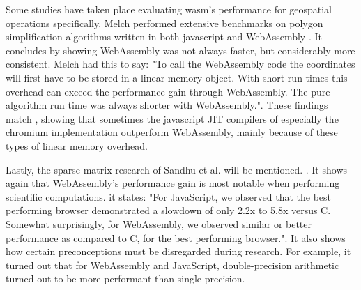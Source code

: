 Some studies have taken place evaluating \ac{wasm}'s performance for geospatial operations specifically. Melch performed extensive benchmarks on polygon simplification algorithms written in both javascript and WebAssembly \cite{melch_performance_2019}. It concludes by showing WebAssembly was not always faster, but considerably more consistent. Melch had this to say: "To call the WebAssembly code the coordinates will first have to be stored in a linear memory object. With short run times this overhead can exceed the performance gain through WebAssembly. The pure algorithm run time was always shorter with WebAssembly.". These findings match \cite{jangda_not_2019}, showing that sometimes the javascript JIT compilers of especially the chromium implementation outperform WebAssembly, mainly because of these types of linear memory overhead.

Lastly, the sparse matrix research of Sandhu et al. will be mentioned. \cite{sandhu_sparse_2018}. It shows again that WebAssembly's performance gain is most notable when performing scientific computations. it states: "For JavaScript, we observed that the best performing browser demonstrated a slowdown of only 2.2x to 5.8x versus C. Somewhat surprisingly, for WebAssembly, we observed similar or better performance as compared to C, for the best performing browser.". It also shows how certain preconceptions must be disregarded during research. For example, it turned out that for WebAssembly and JavaScript, double-precision arithmetic turned out to be more performant than single-precision.








